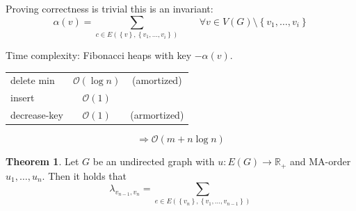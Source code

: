 \documentclass[a4paper]{article}
\theoremstyle{definition}
\newtheorem{theorem}{Theorem}
\newcommand{\set}[1]{\left\{#1\right\}}
\begin{document}
Proving correctness is trivial this is an invariant:
\[
  \alpha(v) = \sum_{c \in E(\set{v}, \set{v_1, \ldots, v_i})}
    \qquad \forall v \in V(G) \setminus \set{v_1, \ldots, v_i}
\]

Time complexity:
Fibonacci heaps with key $-\alpha(v)$.

\begin{center}
  \begin{tabular}{lcc}
    delete min   & $\mathcal{O}(\log{n})$ & (amortized) \\
    insert       & $\mathcal{O}(1)$       & \\
    decrease-key & $\mathcal{O}(1)$       & (armortized)
  \end{tabular}
  \[ \Rightarrow \mathcal{O}(m + n \log{n}) \]
\end{center}

\begin{theorem}\label{lemma-4.21}
  Let $G$ be an undirected graph with $u: E(G) \rightarrow \mathbb{R}_+$ and MA-order $u_1, \ldots, u_n$.
  Then it holds that
  \[
    \lambda_{v_{n-1}, v_n} = \sum_{e \in E(\set{v_n}, \set{v_1, \ldots, v_{n-1}})}
  \]
\end{theorem}
\end{document}
